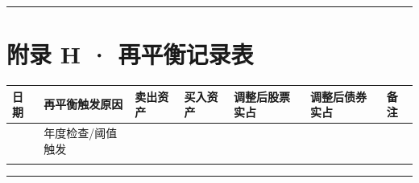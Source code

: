 \documentclass[a4paper,11pt,oneside,fontset=none,UTF8,zihao=-4]{ctexbook}
\begin{document}
\begin{center}{\color{dh-bronze}\rule{0.2\textwidth}{0.5pt}}\end{center}

\section{附录 H ·
再平衡记录表}\label{ux9644ux5f55-h-ux518dux5e73ux8861ux8bb0ux5f55ux8868}

\begin{longtable}[]{@{}
  >{\raggedright\arraybackslash}p{}
  >{\raggedright\arraybackslash}p{}
  >{\raggedright\arraybackslash}p{}
  >{\raggedright\arraybackslash}p{}
  >{\raggedright\arraybackslash}p{}
  >{\raggedright\arraybackslash}p{}
  >{\raggedright\arraybackslash}p{}@{}}
\toprule\noalign{}\rowcolor{dh-pink!25}
\begin{minipage}[b]{\linewidth}\raggedright
日期
\end{minipage} & \begin{minipage}[b]{\linewidth}\raggedright
再平衡触发原因
\end{minipage} & \begin{minipage}[b]{\linewidth}\raggedright
卖出资产
\end{minipage} & \begin{minipage}[b]{\linewidth}\raggedright
买入资产
\end{minipage} & \begin{minipage}[b]{\linewidth}\raggedright
调整后股票实占
\end{minipage} & \begin{minipage}[b]{\linewidth}\raggedright
调整后债券实占
\end{minipage} & \begin{minipage}[b]{\linewidth}\raggedright
备注
\end{minipage} \\
\midrule\noalign{}
\endhead
\bottomrule\noalign{}
\endlastfoot
& 年度检查/阈值触发 & & & & & \\
& & & & & & \\
\end{longtable}

\begin{center}{\color{dh-bronze}\rule{0.2\textwidth}{0.5pt}}\end{center}
\end{document}
